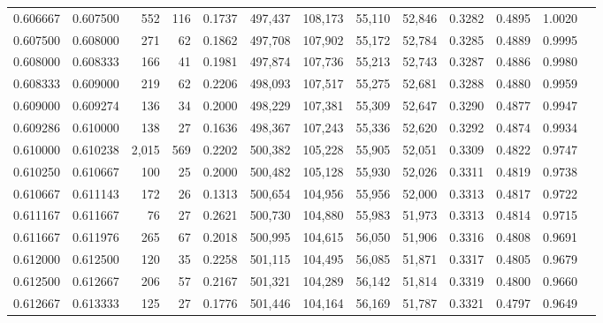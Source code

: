 \begin{tabular}{rrrrrrrrrrrrr}
0.606667 & 0.607500 &   552 & 116 &                                     0.1737 & 497,437 & 108,173 &  55,110 &  52,846 & 0.3282 & 0.4895 & 1.0020 \\
0.607500 & 0.608000 &   271 &  62 &                                     0.1862 & 497,708 & 107,902 &  55,172 &  52,784 & 0.3285 & 0.4889 & 0.9995 \\
0.608000 & 0.608333 &   166 &  41 &                                     0.1981 & 497,874 & 107,736 &  55,213 &  52,743 & 0.3287 & 0.4886 & 0.9980 \\
0.608333 & 0.609000 &   219 &  62 &                                     0.2206 & 498,093 & 107,517 &  55,275 &  52,681 & 0.3288 & 0.4880 & 0.9959 \\
0.609000 & 0.609274 &   136 &  34 &                                     0.2000 & 498,229 & 107,381 &  55,309 &  52,647 & 0.3290 & 0.4877 & 0.9947 \\
0.609286 & 0.610000 &   138 &  27 &                                     0.1636 & 498,367 & 107,243 &  55,336 &  52,620 & 0.3292 & 0.4874 & 0.9934 \\
0.610000 & 0.610238 & 2,015 & 569 &                                     0.2202 & 500,382 & 105,228 &  55,905 &  52,051 & 0.3309 & 0.4822 & 0.9747 \\
0.610250 & 0.610667 &   100 &  25 &                                     0.2000 & 500,482 & 105,128 &  55,930 &  52,026 & 0.3311 & 0.4819 & 0.9738 \\
0.610667 & 0.611143 &   172 &  26 &                                     0.1313 & 500,654 & 104,956 &  55,956 &  52,000 & 0.3313 & 0.4817 & 0.9722 \\
0.611167 & 0.611667 &    76 &  27 &                                     0.2621 & 500,730 & 104,880 &  55,983 &  51,973 & 0.3313 & 0.4814 & 0.9715 \\
0.611667 & 0.611976 &   265 &  67 &                                     0.2018 & 500,995 & 104,615 &  56,050 &  51,906 & 0.3316 & 0.4808 & 0.9691 \\
0.612000 & 0.612500 &   120 &  35 &                                     0.2258 & 501,115 & 104,495 &  56,085 &  51,871 & 0.3317 & 0.4805 & 0.9679 \\
0.612500 & 0.612667 &   206 &  57 &                                     0.2167 & 501,321 & 104,289 &  56,142 &  51,814 & 0.3319 & 0.4800 & 0.9660 \\
0.612667 & 0.613333 &   125 &  27 &                                     0.1776 & 501,446 & 104,164 &  56,169 &  51,787 & 0.3321 & 0.4797 & 0.9649 \\

\end{tabular}
